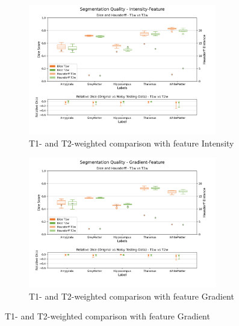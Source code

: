 \documentclass[conference]{IEEEtran}
\begin{document}
\clearpage
\onecolumn 

\begin{appendices}

\appendix

\listoffigures

\listoftables

\begin{figure}
    \begin{subfigure}
      \centering
      \includegraphics[width=0.9\textwidth, trim={0 15mm 0 10mm}, clip]{images/01_T1W_C_I_and_05_T2W_C_I.png}
      \caption{T1- and T2-weighted comparison with feature Intensity}
    \end{subfigure}
    \hspace{100mm}
    \begin{subfigure}
      \centering
      \includegraphics[width=0.9\textwidth, trim={0 15mm 0 10mm}, clip]{images/02_T1W_C_G_and_06_T2W_C_G.png}
      \caption{T1- and T2-weighted comparison with feature Gradient}
    \end{subfigure}
    \label{fig:firstTwo}
\end{figure}


\end{appendices}
\end{document}
